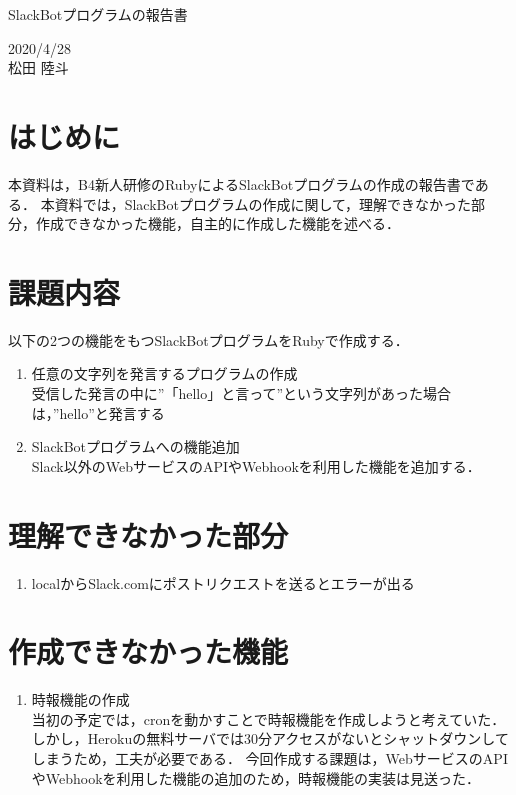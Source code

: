 \documentclass[12pt]{jsarticle}
\begin{document}
\begin{center}
{\LARGE SlackBotプログラムの報告書}
\end{center}

\begin{flushright}
  2020/4/28\\
  松田 陸斗
\end{flushright}
\section{はじめに}
\label{sec:introduction}
本資料は，B4新人研修のRubyによるSlackBotプログラムの作成の報告書である．
本資料では，SlackBotプログラムの作成に関して，理解できなかった部分，作成できなかった機能，自主的に作成した機能を述べる．

\section{課題内容}
以下の2つの機能をもつSlackBotプログラムをRubyで作成する．
\begin{enumerate}
\item 任意の文字列を発言するプログラムの作成\\
受信した発言の中に''「hello」と言って''という文字列があった場合は，''hello''と発言する
\item SlackBotプログラムへの機能追加\\
Slack以外のWebサービスのAPIやWebhookを利用した機能を追加する．
\end{enumerate}

\section{理解できなかった部分}
\begin{enumerate}
\item 	localからSlack.comにポストリクエストを送るとエラーが出る\\
\end{enumerate}

\section{作成できなかった機能}
\begin{enumerate}
\item 時報機能の作成\\
当初の予定では，cronを動かすことで時報機能を作成しようと考えていた．
しかし，Herokuの無料サーバでは30分アクセスがないとシャットダウンしてしまうため，工夫が必要である．
今回作成する課題は，WebサービスのAPIやWebhookを利用した機能の追加のため，時報機能の実装は見送った．
\end{enumerate}
\end{document}
